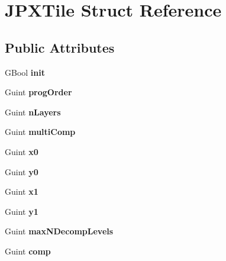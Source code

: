 \hypertarget{struct_j_p_x_tile}{}\section{J\+P\+X\+Tile Struct Reference}
\label{struct_j_p_x_tile}
\subsection*{Public Attributes}
\begin{DoxyCompactItemize}
\item 
\mbox{\label{struct_j_p_x_tile_a972bcf74101c4167960783a1a55bb38e}} 
G\+Bool {\bfseries init}
\item 
\mbox{\label{struct_j_p_x_tile_a81593c20ff028e84c18699e30a6e945f}} 
Guint {\bfseries prog\+Order}
\item 
\mbox{\label{struct_j_p_x_tile_ab4d653d133a6ae24321c8d860c8ff8b4}} 
Guint {\bfseries n\+Layers}
\item 
\mbox{\label{struct_j_p_x_tile_aa5231301f0af9af351f92b21bcd0aaa6}} 
Guint {\bfseries multi\+Comp}
\item 
\mbox{\label{struct_j_p_x_tile_a77768871356982d6fd9924936728da0f}} 
Guint {\bfseries x0}
\item 
\mbox{\label{struct_j_p_x_tile_a2c55c4043e76f4273fca735281207c9b}} 
Guint {\bfseries y0}
\item 
\mbox{\label{struct_j_p_x_tile_a9689cd7cafdc540181ddd34434a869ee}} 
Guint {\bfseries x1}
\item 
\mbox{\label{struct_j_p_x_tile_a26ae21c9b47075a0ea12e0888ebe3d70}} 
Guint {\bfseries y1}
\item 
\mbox{\label{struct_j_p_x_tile_a413e5743917d67527e41cc2568a99a25}} 
Guint {\bfseries max\+N\+Decomp\+Levels}
\item 
\mbox{\label{struct_j_p_x_tile_a6fc9c5f7d8e411d12f331c25d2e2f5a3}} 
Guint {\bfseries comp}

\end{DoxyCompactItemize}

